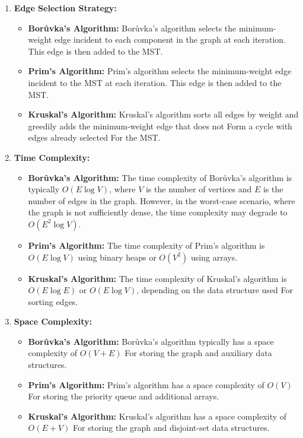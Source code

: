 \documentclass[12pt]{book} %
\begin{document}
\begin{enumerate}
    \item \textbf{Edge Selection Strategy:}
    \begin{itemize}
        \item \textbf{Borůvka's Algorithm:} Borůvka's algorithm selects the minimum-weight edge incident to each component in the graph at each iteration. This edge is then added to the MST.
        \item \textbf{Prim's Algorithm:} Prim's algorithm selects the minimum-weight edge incident to the MST at each iteration. This edge is then added to the MST.
        \item \textbf{Kruskal's Algorithm:} Kruskal's algorithm sorts all edges by weight and greedily adds the minimum-weight edge that does not Form a cycle with edges already selected For the MST.
    \end{itemize}
    
    \item \textbf{Time Complexity:}
    \begin{itemize}
        \item \textbf{Borůvka's Algorithm:} The time complexity of Borůvka's algorithm is typically $O(E \log V)$, where $V$ is the number of vertices and $E$ is the number of edges in the graph. However, in the worst-case scenario, where the graph is not sufficiently dense, the time complexity may degrade to $O(E^2 \log V)$.
        \item \textbf{Prim's Algorithm:} The time complexity of Prim's algorithm is $O(E \log V)$ using binary heaps or $O(V^2)$ using arrays.
        \item \textbf{Kruskal's Algorithm:} The time complexity of Kruskal's algorithm is $O(E \log E)$ or $O(E \log V)$, depending on the data structure used For sorting edges.
    \end{itemize}
    
    \item \textbf{Space Complexity:}
    \begin{itemize}
        \item \textbf{Borůvka's Algorithm:} Borůvka's algorithm typically has a space complexity of $O(V + E)$ For storing the graph and auxiliary data structures.
        \item \textbf{Prim's Algorithm:} Prim's algorithm has a space complexity of $O(V)$ For storing the priority queue and additional arrays.
        \item \textbf{Kruskal's Algorithm:} Kruskal's algorithm has a space complexity of $O(E + V)$ For storing the graph and disjoint-set data structures.
    \end{itemize}
    

\end{enumerate}
\end{document}
